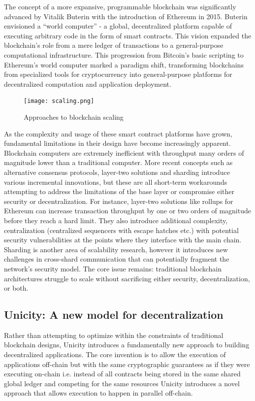 \documentclass{article}
\begin{document}
The concept of a more expansive, programmable blockchain was significantly advanced by Vitalik Buterin with the introduction of Ethereum in 2015. Buterin envisioned a ``world computer'' - a global, decentralized platform capable of executing arbitrary code in the form of smart contracts. This vision expanded the blockchain's role from a mere ledger of transactions to a general-purpose computational infrastructure. This progression from Bitcoin's basic scripting to Ethereum's world computer marked a paradigm shift, transforming blockchains from specialized tools for cryptocurrency into general-purpose platforms for decentralized computation and application deployment.

\begin{figure}[H]
    \centering
    \texttt{[image: scaling.png]}
    \caption{Approaches to blockchain scaling}
    \label{fig:scaling}
\end{figure}


As the complexity and usage of these smart contract platforms have grown, fundamental limitations in their design have become increasingly apparent. Blockchain computers are extremely inefficient with throughput many orders of magnitude lower than a traditional computer. More recent concepts such as alternative consensus protocols, layer-two solutions and sharding introduce various incremental innovations, but these are all short-term workarounds attempting to address the limitations of the base layer or compromise either security or decentralization. For instance, layer-two solutions like rollups for Ethereum can increase transaction throughput by one or two orders of magnitude before they reach a hard limit. They also introduce additional complexity, centralization (centralized sequencers with escape hatches etc.) with potential security vulnerabilities at the points where they interface with the main chain. Sharding is another area of scalability research, however it introduces new challenges in cross-shard communication that can potentially fragment the network's security model. The core issue remains: traditional blockchain architectures struggle to scale without sacrificing either security, decentralization, or both.

\subsection{Unicity: A new model for decentralization}

Rather than attempting to optimize within the constraints of traditional blockchain designs, Unicity introduces a fundamentally new approach to building decentralized applications. The core invention is to allow the execution of applications off-chain but with the same cryptographic guarantees as if they were executing on-chain i.e. instead of all contracts being stored in the same shared global ledger and competing for the same resources Unicity introduces a novel approach that allows execution to happen in parallel off-chain.
\end{document}
